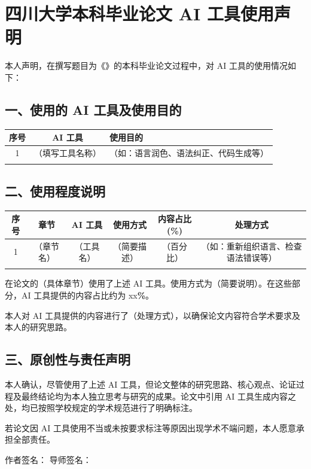 
\chapter*{四川大学本科毕业论文 AI 工具使用声明}

本人声明，在撰写题目为《\varTitle》的本科毕业论文过程中，对 AI 工具的使用情况如下：

\section*{一、使用的 AI 工具及使用目的}

\begin{table}[H]
\centering
\renewcommand{\arraystretch}{1.3}
\begin{tabular}{|c|c|p{6cm}|}
\hline
序号 & AI 工具 & 使用目的 \\
\hline
1  & （填写工具名称） & （如：语言润色、语法纠正、代码生成等） \\
\hline
\multicolumn{3}{c}{} \\
\end{tabular}
\end{table}

\section*{二、使用程度说明}

\begin{table}[H]
\centering
\renewcommand{\arraystretch}{1.3}
\begin{tabular}{|c|c|c|c|c|c|}
\hline
序号 & 章节 & AI 工具 & 使用方式 & 内容占比(\%) & 处理方式 \\
\hline
1 & （章节名） & （工具名） & （简要描述） & （百分比） & （如：重新组织语言、检查语法错误等） \\
\hline
\multicolumn{6}{c}{} \\
\end{tabular}
\end{table}

在论文的（具体章节）使用了上述 AI 工具。使用方式为（简要说明）。在这些部分，AI 工具提供的内容占比约为 xx\textbf{\%}。

本人对 AI 工具提供的内容进行了（处理方式），以确保论文内容符合学术要求及本人的研究思路。

\section*{三、原创性与责任声明}

本人确认，尽管使用了上述 AI 工具，但论文整体的研究思路、核心观点、论证过程及最终结论均为本人独立思考与研究的成果。论文中引用 AI 工具生成内容之处，均已按照学校规定的学术规范进行了明确标注。

若论文因 AI 工具使用不当或未按要求标注等原因出现学术不端问题，本人愿意承担全部责任。

\vspace{20pt}

作者签名：\hspace{3cm}
\hfill
导师签名：\hspace{3cm}

\vspace{0.5cm}

\begin{flushright}
\end{flushright}
